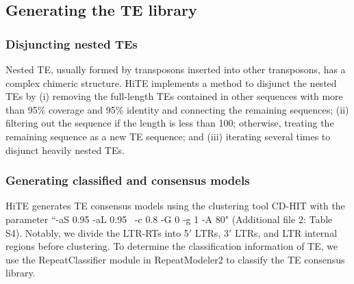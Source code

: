 \documentclass{bmcart}
\begin{document}
\subsection*{Generating the TE library}
\subsubsection*{Disjuncting nested TEs}
Nested TE, usually formed by transposons inserted into other transposons, has a complex chimeric structure. HiTE implements a method to disjunct the nested TEs by (i) removing the full-length TEs contained in other sequences with more than 95\% coverage and 95\% identity and connecting the remaining sequences; (ii) filtering out the sequence if the length is less than 100; otherwise, treating the remaining sequence as a new TE sequence; and (iii) iterating several times to disjunct heavily nested TEs.

\subsubsection*{Generating classified and consensus models}
HiTE generates TE consensus models using the clustering tool CD-HIT\cite{li2006cd} with the parameter ``-aS 0.95 -aL 0.95  -c 0.8 -G 0 -g 1 -A 80" (Additional file 2: Table S4). Notably, we divide the LTR-RTs into 5$'$ LTRs, 3$'$ LTRs, and LTR internal regions before clustering. To determine the classification information of TE, we use the RepeatClassifier module in RepeatModeler2\cite{flynn2020repeatmodeler2} to classify the TE consensus library.




%
\end{document}

